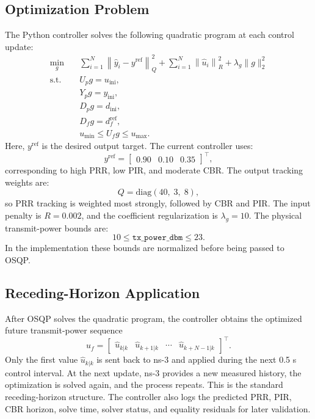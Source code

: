 \documentclass[11pt]{article}
\begin{document}
\subsection{Optimization Problem}

The Python controller solves the following quadratic program at each control
update:
\[
\begin{aligned}
\min_{g} \quad
& \sum_{i=1}^{N}
    \left\lVert \hat{y}_{i} - y^{\mathrm{ref}} \right\rVert_Q^2
  + \sum_{i=1}^{N}
    \left\lVert \hat{u}_{i} \right\rVert_R^2
  + \lambda_g \lVert g \rVert_2^2 \\
\text{s.t.} \quad
& U_p g = u_{\mathrm{ini}}, \\
& Y_p g = y_{\mathrm{ini}}, \\
& D_p g = d_{\mathrm{ini}}, \\
& D_f g = d_f^{\mathrm{ref}}, \\
& u_{\min} \leq U_f g \leq u_{\max}.
\end{aligned}
\]
Here, $y^{\mathrm{ref}}$ is the desired output target. The current controller
uses:
\[
y^{\mathrm{ref}} =
\begin{bmatrix}
0.90 & 0.10 & 0.35
\end{bmatrix}^{\top},
\]
corresponding to high PRR, low PIR, and moderate CBR. The output tracking
weights are:
\[
Q = \mathrm{diag}(40,\;3,\;8),
\]
so PRR tracking is weighted most strongly, followed by CBR and PIR. The input
penalty is $R = 0.002$, and the coefficient regularization is
$\lambda_g = 10$. The physical transmit-power bounds are:
\[
10 \leq \texttt{tx\_power\_dbm} \leq 23.
\]
In the implementation these bounds are normalized before being passed to OSQP.

\subsection{Receding-Horizon Application}

After OSQP solves the quadratic program, the controller obtains the optimized
future transmit-power sequence
\[
\hat{u}_f =
\begin{bmatrix}
\hat{u}_{k|k} &
\hat{u}_{k+1|k} &
\cdots &
\hat{u}_{k+N-1|k}
\end{bmatrix}^{\top}.
\]
Only the first value $\hat{u}_{k|k}$ is sent back to ns-3 and applied during
the next 0.5 s control interval. At the next update, ns-3 provides a new
measured history, the optimization is solved again, and the process repeats.
This is the standard receding-horizon structure. The controller also logs the
predicted PRR, PIR, CBR horizon, solve time, solver status, and equality
residuals for later validation.
\end{document}
